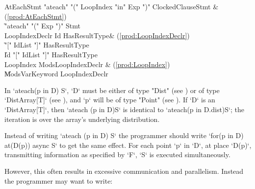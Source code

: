 \begin{bbgrammar}
          AtEachStmt \: \xcd"ateach" \xcd"(" LoopIndex \xcd"in" Exp \xcd")" ClockedClause\opt Stmt & (\ref{prod:AtEachStmt}) \\
                     \| \xcd"ateach" \xcd"(" Exp \xcd")" Stmt \\
      LoopIndexDeclr \: Id HasResultType\opt & (\ref{prod:LoopIndexDeclr}) \\
                     \| \xcd"[" IdList \xcd"]" HasResultType\opt \\
                     \| Id \xcd"[" IdList \xcd"]" HasResultType\opt \\
           LoopIndex \: Mods\opt LoopIndexDeclr & (\ref{prod:LoopIndex}) \\
                     \| Mods\opt VarKeyword LoopIndexDeclr \\
\end{bbgrammar}
In \xcd`ateach(p in D) S`, \xcd`D` must be either of type \xcd"Dist"
(see ) or of type \xcd`DistArray[T]` (see
), and \xcd`p` will be of type \xcd"Point" (see
). If \xcd`D` is an \xcd`DistArray[T]`, then
\xcd`ateach (p in D)S` is identical to 
\xcd`ateach(p in D.dist)S`; the iteration is over the array's underlying
distribution.   

Instead of writing \xcd`ateach (p in D) S` the programmer should write 
\xcd`for(p in D) at(D(p)) async S` to get the same effect. 
For each point \xcd`p` in \xcd`D`, at place \xcd`D(p)`, transmitting
information as specified by \xcd`F`, 
\xcd`S` is
executed simultaneously.

However, this often results in excessive communication and parallelism. Instead the
programmer may want to write: 


